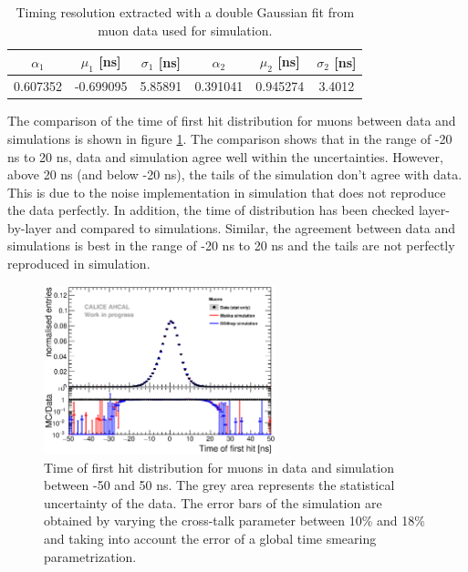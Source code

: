 \begin{table}[htb!]
	\centering
	\caption{Timing resolution extracted with a double Gaussian fit from muon data used for simulation.}
	\label{table:time_res_sim}
	\begin{tabular}{@{} cccccc @{}}
		\toprule
		$\alpha_{1}$ & $\mu_{1}$ [ns] & $\sigma_{1}$ [ns] & $\alpha_{2}$ & $\mu_{2}$ [ns] & $\sigma_{2}$ [ns] \\
		\midrule
		0.607352 & -0.699095 & 5.85891 & 0.391041 & 0.945274 & 3.4012 \\
		\bottomrule
	\end{tabular}
\end{table}

The comparison of the time of first hit distribution for muons between data and simulations is shown in figure \ref{fig:sim_data_muon}. The comparison shows that in the range of -20 ns to 20 ns, data and simulation agree well within the uncertainties. However, above 20 ns (and below -20 ns), the tails of the simulation don't agree with data. This is due to the noise implementation in simulation that does not reproduce the data perfectly. In addition, the time of distribution has been checked layer-by-layer and compared to simulations. Similar, the agreement between data and simulations is best in the range of -20 ns to 20 ns and the tails are not perfectly reproduced in simulation.

\begin{figure}[htbp!]
	\centering
	\includegraphics[width=0.6\textwidth]{../Thesis_Plots/Timing/Muons/Plots/Comparison_MokkaDD4hepData_Muons.eps}
	\caption{Time of first hit distribution for muons in data and simulation between -50 and 50 ns. The grey area represents the statistical uncertainty of the data. The error bars of the simulation are obtained by varying the cross-talk parameter between 10\% and 18\% and taking into account the error of a global time smearing parametrization.}
	\label{fig:sim_data_muon}
\end{figure}

